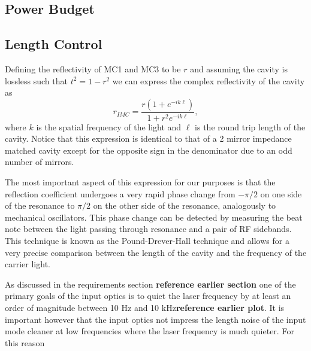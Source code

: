 \documentclass[10pt,a4paper]{article}
\begin{document}
\subsection{Power Budget}

\subsection{Length Control}
Defining the reflectivity of MC1 and MC3 to be $r$ and assuming the cavity is lossless such that 
$t^2 = 1-r^2$ we can express the complex reflectivity of the cavity as 
\begin{equation}
	r_{IMC} = \frac{r(1+e^{-ik\ell})}{1+r^2e^{-ik\ell}},
\end{equation}
where $k$ is the spatial frequency of the light and $\ell$ is the round trip length of the cavity.  
Notice that this expression is identical to that of a 2 mirror impedance matched cavity except 
for the opposite sign in the denominator due to an odd number of mirrors.  

The most important aspect of this expression for our purposes is that the reflection coefficient 
undergoes a very rapid phase change from $-\pi/2$ on one side of the resonance to $\pi/2$ 
on the other side of the resonance, analogously to mechanical oscillators.  
This phase change can be detected by measuring the beat note between the light passing 
through resonance and a pair of RF sidebands.  
This technique is known as the Pound-Drever-Hall technique\cite{EricBlack}\cite{DreverHall} 
and allows for a very precise comparison between the length of the cavity and the frequency 
of the carrier light.  

As discussed in the requirements section \textbf{reference earlier section} one of the primary 
goals of the input optics is to quiet the laser frequency by at least an order of magnitude 
between 10 Hz and 10 kHz\textbf{reference earlier plot}.  
It is important however that the input optics not impress the length noise of the input mode 
cleaner at low frequencies where the laser frequency is much quieter.  
For this reason 
\end{document}

